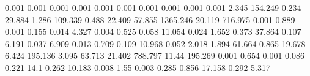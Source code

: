 0.001      0.001      %
0.001      0.001      %
0.001      0.001      %
0.001      0.001      %
0.001      0.001      %
2.345      154.249    %
0.234      29.884     %
1.286      109.339    %
0.488      22.409     %
57.855     1365.246   %
20.119     716.975    %
0.001      0.889      %
0.001      0.155      %
0.014      4.327      %
0.004      0.525      %
0.058      11.054     %
0.024      1.652      %
0.373      37.864     %
0.107      6.191      %
0.037      6.909      %
0.013      0.709      %
0.109      10.968     %
0.052      2.018      %
1.894      61.664     %
0.865      19.678     %
6.424      195.136    %
3.095      63.713     %
21.402     788.797    %
11.44      195.269    %
0.001      0.654      %
0.001      0.086      %
0.221      14.1       %
0.262      10.183     %
0.008      1.55       %
0.003      0.285      %
0.856      17.158     %
0.292      5.317      %
